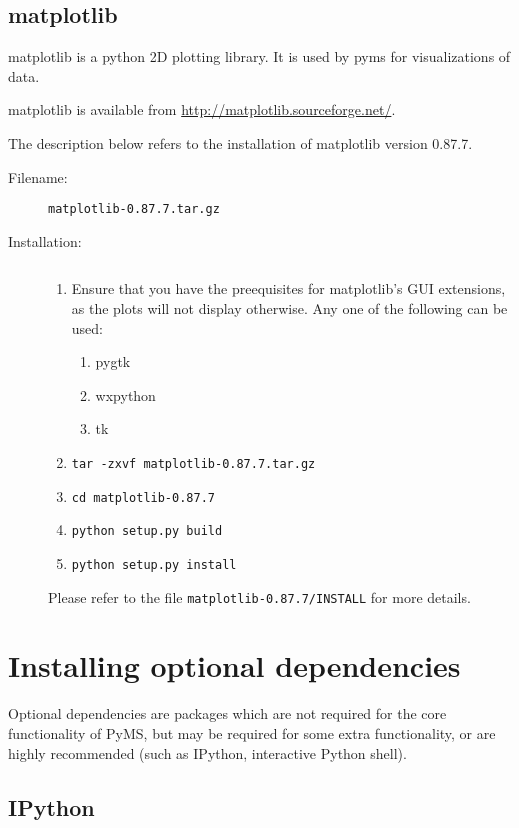 \subsection{matplotlib}

matplotlib is a python 2D plotting library.  It is used by pyms for 
visualizations of data.

matplotlib is available from \url{http://matplotlib.sourceforge.net/}.

The description below refers to the installation of matplotlib version
0.87.7.

\begin{description}
\item [Filename:] {\tt matplotlib-0.87.7.tar.gz}
\item [Installation:] $ $
  \begin{enumerate}
  \item Ensure that you have the preequisites for matplotlib's GUI
        extensions, as the plots will not display otherwise. Any one of
        the following can be used:
        \begin{enumerate}
        \item pygtk
        \item wxpython
        \item tk
        \end{enumerate}
  \item {\tt tar -zxvf matplotlib-0.87.7.tar.gz}
  \item {\tt cd matplotlib-0.87.7}
  \item {\tt python setup.py build}
  \item {\tt python setup.py install}
  \end{enumerate}
Please refer to the file {\tt matplotlib-0.87.7/INSTALL} for more
details.
\end{description}

\section{Installing optional dependencies}

Optional dependencies are packages which are not required for the
core functionality of PyMS, but may be required for some extra
functionality, or are highly recommended (such as IPython, interactive
Python shell). 

\subsection{IPython}

